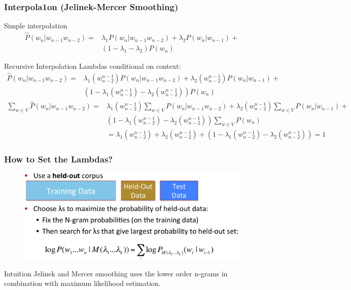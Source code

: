 \documentclass{beamer}
\begin{document}
\begin{frame}\frametitle{Interpola1on (Jelinek-Mercer Smoothing)}

\begin{block}{Simple interpolation}
\vspace{-15pt}
\begin{align*}
\hat{P}(w_n|w_{n-1}w_{n-2})= & \lambda_1 P(w_n|w_{n-1}w_{n-2}) + \lambda_2 P(w_n|w_{n-1}) + \\
& (1-\lambda_1 - \lambda_2) P(w_n) 
\end{align*}
\end{block}

\begin{block}{Recursive Interpolation}
Lambdas conditional on context:
\vspace{-5pt}
\begin{align*}
\hat{P}(w_n|w_{n-1}w_{n-2})= & \lambda_1(w_{n-2}^{n-1}) P(w_n|w_{n-1}w_{n-2}) + \lambda_2(w_{n-2}^{n-1}) P(w_n|w_{n-1}) + \\
& (1-\lambda_1(w_{n-2}^{n-1}) - \lambda_2(w_{n-2}^{n-1})) P(w_n) 
\end{align*}
\vspace{-10pt}
{\footnotesize
\begin{align*}
\sum_{w\in V}\hat{P}(w_n|w_{n-1}w_{n-2})= &
\lambda_1(w_{n-2}^{n-1}) \sum_{w\in V}  P(w_n|w_{n-1}w_{n-2}) + \lambda_2(w_{n-2}^{n-1})\sum_{w\in V}  P(w_n|w_{n-1}) + \\
& (1-\lambda_1(w_{n-2}^{n-1}) -
\lambda_2(w_{n-2}^{n-1})) \sum_{w\in V} P(w_n)\\
& =  \lambda_1(w_{n-2}^{n-1}) + \lambda_2(w_{n-2}^{n-1}) + (1-\lambda_1(w_{n-2}^{n-1}) -
\lambda_2(w_{n-2}^{n-1})) = 1
\end{align*}
}%
\end{block}


\end{frame}



\begin{frame}\frametitle{How to Set the Lambdas?}
\begin{figure}
\includegraphics[width=0.9\linewidth]{figure/lambda_set_interpolation.pdf}
\end{figure}

\begin{block}{Intuition}
Jelinek and Mercer smoothing uses the lower order n-grams in combination with maximum
likelihood estimation.
\end{block}

\end{frame}
\end{document}
